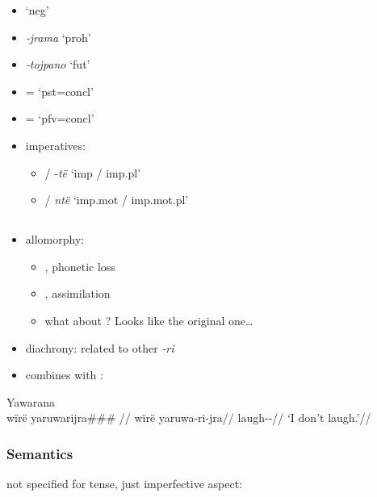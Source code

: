 \documentclass{memoir}
\begin{document}
\begin{itemize}
\item
   `neg'
\item
  \emph{‑jrama} `proh'
\item
  \emph{‑tojpano} `fut'
\item
  = `pst=concl'
\item
  = `pfv=concl'
\item
  imperatives:

  \begin{itemize}
  \tightlist
  \item
     / ‑\emph{të} `imp / imp.pl'
  \item
     / \emph{ntë} `imp.mot / imp.mot.pl'
  \end{itemize}
\end{itemize}

\subsection{\texorpdfstring{}{}}

\begin{itemize}
\tightlist
\item
  allomorphy:

  \begin{itemize}
  \tightlist
  \item
    , phonetic loss
  \item
    , assimilation
  \item
    what about ? Looks like the original one\ldots{}
  \end{itemize}
\item
  diachrony: related to other \emph{-ri}
\item
  combines with :
\end{itemize}

\ex Yawarana \\
\label{convrisamaj-04}    \begingl
    \glpreamble  wïrë yaruwarijra\#\#\# //
    \gla wïrë yaruwa-ri-jra//
    \glb {} laugh--//
        \glft ‘I don’t laugh.’//  
    \endgl 
\xe

\subsubsection{Semantics}

not specified for tense, just imperfective aspect:
\end{document}
